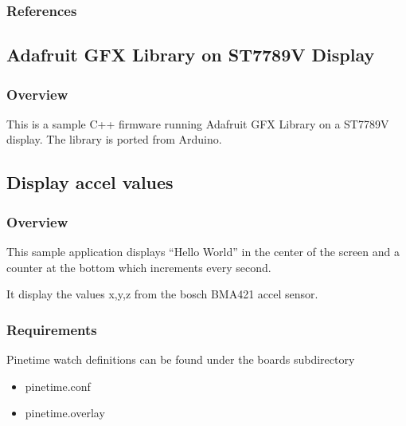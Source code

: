 \documentclass[letterpaper,10pt,english]{sphinxmanual}
\begin{document}
\subsubsection{References}
\label{\detokenize{samples/gui/clock/README:references}}

\subsection{Adafruit GFX Library on ST7789V Display}
\label{\detokenize{samples/gui/gfx/README:adafruit-gfx-library-on-st7789v-display}}\label{\detokenize{samples/gui/gfx/README:gfx-sample}}\label{\detokenize{samples/gui/gfx/README::doc}}

\subsubsection{Overview}
\label{\detokenize{samples/gui/gfx/README:overview}}
This is a sample C++ firmware running Adafruit GFX Library on a ST7789V display. The library is ported from Arduino.


\subsection{Display accel values}
\label{\detokenize{samples/gui/lvaccel/README:display-accel-values}}\label{\detokenize{samples/gui/lvaccel/README:lvaccel-sample}}\label{\detokenize{samples/gui/lvaccel/README::doc}}

\subsubsection{Overview}
\label{\detokenize{samples/gui/lvaccel/README:overview}}
This sample application displays “Hello World” in the center of the screen
and a counter at the bottom which increments every second.

It display the values x,y,z from the bosch BMA421 accel sensor.


\subsubsection{Requirements}
\label{\detokenize{samples/gui/lvaccel/README:requirements}}
Pinetime watch
definitions can be found under the boards sub\sphinxhyphen{}directory
\begin{itemize}
\item {} 
pinetime.conf

\item {} 
pinetime.overlay

\end{itemize}
\end{document}
